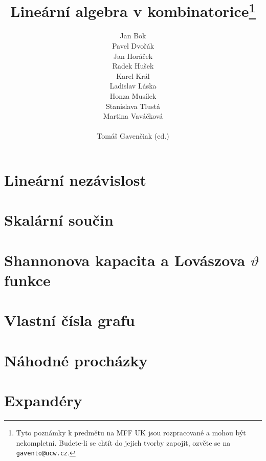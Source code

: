 \documentclass[a4paper,12pt,titlepage]{article}
\title{Lineární algebra v kombinatorice\thanks{Tyto poznámky k predmětu \uv{Lineární algebra v kombinatorice} na MFF UK jsou rozpracované a mohou být nekompletní.
Budete-li se chtít do jejich tvorby zapojit, ozvěte se na {\tt gavento@ucw.cz}.
}}
\author{
Jan Bok\\
Pavel Dvořák\\
Jan Horáček\\
Radek Hušek\\
Karel Král\\
Ladislav Láska\\
Honza Musílek\\
Stanislava Tlustá\\
Martina Vaváčková\\
\\
Tomáš Gavenčiak (ed.)\\}
\begin{document}
\maketitle
\newpage
\tableofcontents
\newpage



\section{Lineární nezávislost}



\medskip


\medskip



\section{Skalární součin}



\medskip


\medskip



\section{Shannonova kapacita a Lovászova $\vartheta$ funkce}





\section{Vlastní čísla grafu}







\section{Náhodné procházky}





\section{Expandéry}




\end{document}
